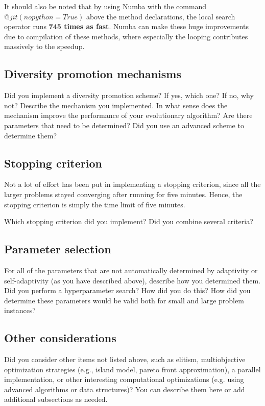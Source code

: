 \documentclass[a4paper,10pt]{article}
\newcommand{\ReplaceMe}[1]{{\color{blue}#1}}
\begin{document}
It should also be noted that by using Numba with the command $@jit(nopython=True)$ above the method declarations, the local search operator runs \textbf{745 times as fast}. Numba can make these huge improvements due to compilation of these methods, where especially the looping contributes massively to the speedup.


\subsection{Diversity promotion mechanisms}
\label{diversity_promotion}
\ReplaceMe{Did you implement a diversity promotion scheme? If yes, which one? If no, why not? Describe the mechanism you implemented. In what sense does the mechanism improve the performance of your evolutionary algorithm? Are there parameters that need to be determined? Did you use an advanced scheme to determine them?}

\subsection{Stopping criterion}
Not a lot of effort has been put in implementing a stopping criterion, since all the larger problems stayed converging after running for five minutes. Hence, the stopping criterion is simply the time limit of five minutes.

\ReplaceMe{Which stopping criterion did you implement? Did you combine several criteria?}

\subsection{Parameter selection}

\ReplaceMe{For all of the parameters that are not automatically determined by adaptivity or self-adaptivity (as you have described above), describe how you determined them. Did you perform a hyperparameter search? How did you do this? How did you determine these parameters would be valid both for small and large problem instances?}

\subsection{Other considerations}


\ReplaceMe{Did you consider other items not listed above, such as elitism, multiobjective optimization strategies (e.g., island model, pareto front approximation), a parallel implementation, or other interesting computational optimizations (e.g. using advanced algorithms or data structures)? You can describe them here or add additional subsections as needed.}
\end{document}
